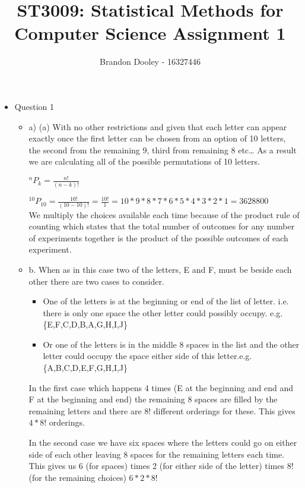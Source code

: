 \documentclass[11pt]{article}
\title{ST3009: Statistical Methods for Computer Science Assignment 1}
\author{Brandon Dooley - 16327446}
\newcommand*{\Perm}[2]{{}^{#1}\!P_{#2}}%
\begin{document}
\maketitle
\begin{itemize}

  \item Question 1
  \begin{itemize}
  	\item a)
  	(a)	With no other restrictions and given that each letter can appear exactly once the first letter can be chosen from an option of 10 letters, the second from the remaining 9, third from remaining 8 etc… As a result we are calculating all of the possible permutations of 10 letters.

  	$\Perm{n}{k}=\frac{n!}{(n-k)!}$

  	$\Perm{10}{10}=\frac{10!}{(10-10)!}=\frac{10!}{1}=10*9*8*7*6*5*4*3*2*1=3628800$\\
    
  	We multiply the choices available each time because of the product rule of counting which states that the total number of outcomes for any number of experiments together is the product of the possible outcomes of each experiment.\\

  	\item b.
  	When as in this case two of the letters, E and F, must be beside each other there are two cases to consider.
  	\begin{itemize}
  	\item One of the letters is at the beginning or end of the list of letter. i.e. there is only one space the other letter could possibly occupy. e.g. \{E,F,C,D,B,A,G,H,I,J\}
  	\item Or one of the letters is in the middle 8 spaces in the list and the other letter could occupy the space either side of this letter.e.g. \{A,B,C,D,E,F,G,H,I,J\}
  	\end{itemize}
  	In the first case which happens 4 times (E at the beginning and end and F at the beginning and end) the remaining 8 spaces are filled by the remaining letters and there are 8! different orderings for these. This gives $4*8!$ orderings.

  	In the second case we have six spaces where the letters could go on either side of each other leaving 8 spaces for the remaining letters each time. This gives us 6 (for spaces) times 2 (for either side of the letter) times 8! (for the remaining choices) $6*2*8!$


\end{itemize}
\end{itemize}
\end{document}
